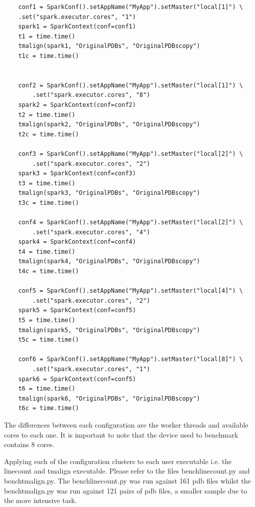 \documentclass[]{final_report}
\begin{document}
\begin{lstlisting}
    conf1 = SparkConf().setAppName("MyApp").setMaster("local[1]") \
    .set("spark.executor.cores", "1")
    spark1 = SparkContext(conf=conf1)
    t1 = time.time()
    tmalign(spark1, "OriginalPDBs", "OriginalPDBscopy")
    t1c = time.time()


    conf2 = SparkConf().setAppName("MyApp").setMaster("local[1]") \
        .set("spark.executor.cores", "8")
    spark2 = SparkContext(conf=conf2)
    t2 = time.time()
    tmalign(spark2, "OriginalPDBs", "OriginalPDBscopy")
    t2c = time.time()

    conf3 = SparkConf().setAppName("MyApp").setMaster("local[2]") \
        .set("spark.executor.cores", "2")
    spark3 = SparkContext(conf=conf3)
    t3 = time.time()
    tmalign(spark3, "OriginalPDBs", "OriginalPDBscopy")
    t3c = time.time()

    conf4 = SparkConf().setAppName("MyApp").setMaster("local[2]") \
        .set("spark.executor.cores", "4")
    spark4 = SparkContext(conf=conf4)
    t4 = time.time()
    tmalign(spark4, "OriginalPDBs", "OriginalPDBscopy")
    t4c = time.time()

    conf5 = SparkConf().setAppName("MyApp").setMaster("local[4]") \
        .set("spark.executor.cores", "2")
    spark5 = SparkContext(conf=conf5)
    t5 = time.time()
    tmalign(spark5, "OriginalPDBs", "OriginalPDBscopy")
    t5c = time.time()

    conf6 = SparkConf().setAppName("MyApp").setMaster("local[8]") \
        .set("spark.executor.cores", "1")
    spark6 = SparkContext(conf=conf5)
    t6 = time.time()
    tmalign(spark6, "OriginalPDBs", "OriginalPDBscopy")
    t6c = time.time()

\end{lstlisting}

The differences between each configuration are the worker threads and available cores to each one. It is important to note that the device used to benchmark contains 8 cores.

Applying each of the configuration clusters to each user executable i.e. the linecount and tmalign executable. Please refer to the files benchlinecount.py and benchtmalign.py. The benchlinecount.py was run against 161 pdb files whilst the benchtmalign.py was run against 121 pairs of pdb files, a smaller sample due to the more intensive task.
\end{document}
